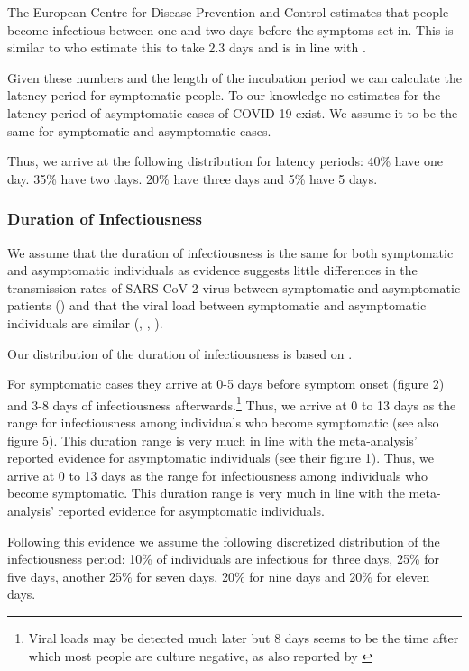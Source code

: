 The European Centre for Disease Prevention and Control estimates that people become infectious between one and two days before the symptoms set in. This is similar to \cite{He2020} who estimate this to take 2.3 days and is in line with \cite{Peak2020}.

Given these numbers and the length of the incubation period we can calculate the latency period for symptomatic people. To our knowledge no estimates for the latency period of asymptomatic cases of COVID-19 exist. We assume it to be the same for symptomatic and asymptomatic cases.

Thus, we arrive at the following distribution for latency periods: 40\% have one day. 35\% have two days. 20\% have three days and 5\% have 5 days.


\subsubsection{Duration of Infectiousness}

We assume that the duration of infectiousness is the same for both symptomatic and asymptomatic individuals as evidence suggests little differences in the transmission rates of SARS-CoV-2 virus between symptomatic and asymptomatic patients (\cite{Yin2020}) and that the viral load between symptomatic and asymptomatic individuals are similar (\cite{Zou2020}, \cite{Byrne2020}, \cite{Singanayagam2020}).

Our distribution of the duration of infectiousness is based on \cite{Byrne2020}.

For symptomatic cases they arrive at 0-5 days before symptom onset (figure 2) and 3-8 days of infectiousness afterwards.\footnote{Viral loads may be detected much later but 8 days seems to be the time after which most people are culture negative, as also reported by \cite{Singanayagam2020}} Thus, we arrive at 0 to 13 days as the range for infectiousness among individuals who become symptomatic (see also figure 5). This duration range is very much in line with the meta-analysis’ reported evidence for asymptomatic individuals (see their figure 1). Thus, we arrive at 0 to 13 days as the range for infectiousness among individuals who become symptomatic. This duration range is very much in line with the meta-analysis' reported evidence for asymptomatic individuals.

Following this evidence we assume the following discretized distribution of the infectiousness period: 10\% of individuals are infectious for three days, 25\% for five days, another 25\% for seven days, 20\% for nine days and 20\% for eleven days.


